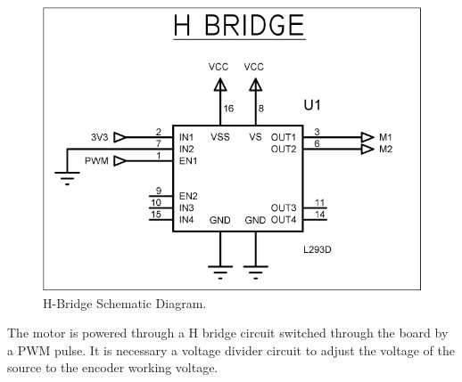 \documentclass[journal]{IEEEtran}
\begin{document}
\begin{figure}[!ht]%
  \includegraphics[scale=0.47]{hBridge.png}
  \centering
  \caption{H-Bridge Schematic Diagram.}
\end{figure}


The motor is powered through a H bridge circuit switched through the board by a PWM pulse. It is necessary a voltage divider circuit to adjust the voltage of the source to the encoder working voltage.
\end{document}
